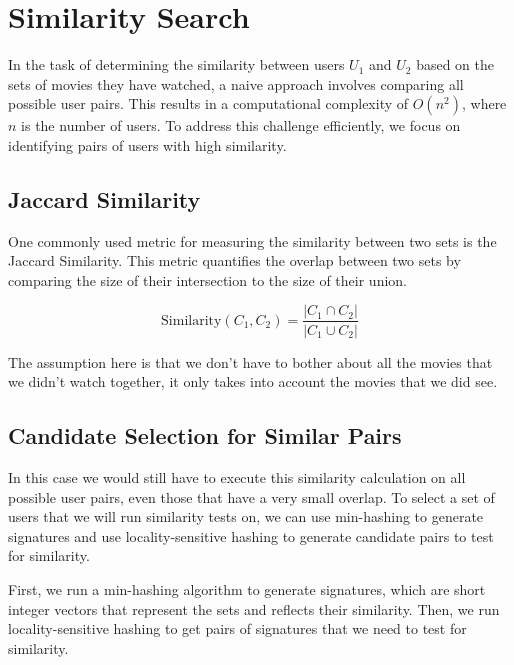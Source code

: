 \section{Similarity Search}

In the task of determining the similarity between users $U_1$ and
$U_2$ based on the sets of movies they have watched, a naive approach
involves comparing all possible user pairs. This results in a
computational complexity of $O(n^2)$, where $n$ is the number of
users. To address this challenge efficiently, we focus on identifying
pairs of users with high similarity.

\subsection{Jaccard Similarity}

One commonly used metric for measuring the similarity between two
sets is the Jaccard Similarity. This metric quantifies the overlap
between two sets by comparing the size of their intersection to the
size of their union.

\begin{definition}
  \begin{displaymath}
    \text{Similarity}(C_1, C_2) = \frac{
      \left|C_1 \cap C_2\right|
    }{
      \left|C_1 \cup C_2\right|
    }
  \end{displaymath}
\end{definition}

The assumption here is that we don't have to bother about all the movies
that we didn't watch together, it only takes into account the movies that
we did see.

\subsection{Candidate Selection for Similar Pairs}

In this case we would still have to execute this similarity calculation on
all possible user pairs, even those that have a very small overlap. To select
a set of users that we will run similarity tests on, we can use min-hashing
to generate signatures and use locality-sensitive hashing to generate candidate
pairs to test for similarity.

First, we run a min-hashing algorithm to generate signatures, which are short
integer vectors that represent the sets and reflects their similarity. Then, we
run locality-sensitive hashing to get pairs of signatures that we need to test
for similarity.


